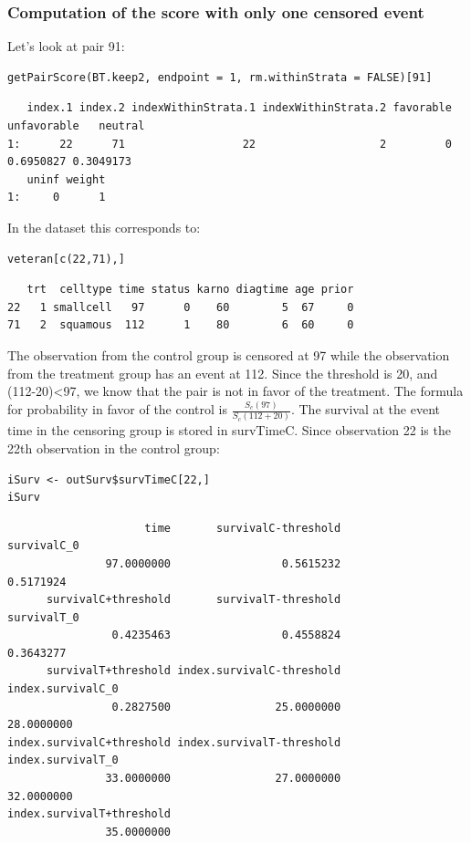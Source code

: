 \documentclass[12pt]{article}
\begin{document}
\subsubsection{Computation of the score with only one censored event}
\label{sec:orgc49aafd}

Let's look at pair 91:
\lstset{language=r,label= ,caption= ,captionpos=b,numbers=none}
\begin{lstlisting}
getPairScore(BT.keep2, endpoint = 1, rm.withinStrata = FALSE)[91]
\end{lstlisting}

\begin{verbatim}
   index.1 index.2 indexWithinStrata.1 indexWithinStrata.2 favorable unfavorable   neutral
1:      22      71                  22                   2         0   0.6950827 0.3049173
   uninf weight
1:     0      1
\end{verbatim}


In the dataset this corresponds to:
\lstset{language=r,label= ,caption= ,captionpos=b,numbers=none}
\begin{lstlisting}
veteran[c(22,71),]
\end{lstlisting}

\begin{verbatim}
   trt  celltype time status karno diagtime age prior
22   1 smallcell   97      0    60        5  67     0
71   2  squamous  112      1    80        6  60     0
\end{verbatim}


The observation from the control group is censored at 97 while the
observation from the treatment group has an event at 112. Since the
threshold is 20, and (112-20)<97, we know that the pair is not in
favor of the treatment. The formula for probability in favor of the
control is \(\frac{S_c(97)}{S_c(112+20)}\). The survival at the event
time in the censoring group is stored in survTimeC. Since observation
22 is the 22th observation in the control group:
\lstset{language=r,label= ,caption= ,captionpos=b,numbers=none}
\begin{lstlisting}
iSurv <- outSurv$survTimeC[22,] 
iSurv
\end{lstlisting}

\begin{verbatim}
                     time       survivalC-threshold               survivalC_0 
               97.0000000                 0.5615232                 0.5171924 
      survivalC+threshold       survivalT-threshold               survivalT_0 
                0.4235463                 0.4558824                 0.3643277 
      survivalT+threshold index.survivalC-threshold         index.survivalC_0 
                0.2827500                25.0000000                28.0000000 
index.survivalC+threshold index.survivalT-threshold         index.survivalT_0 
               33.0000000                27.0000000                32.0000000 
index.survivalT+threshold 
               35.0000000
\end{verbatim}
\end{document}
